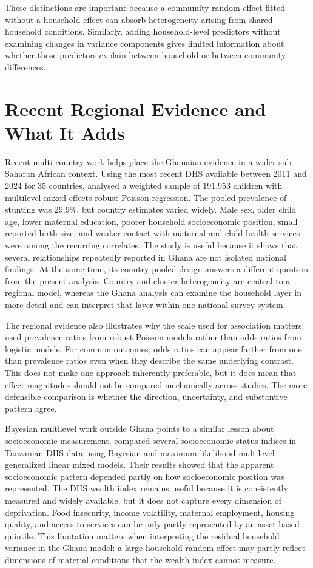 These distinctions are important because a community random effect fitted without a household effect can absorb heterogeneity arising from shared household conditions. Similarly, adding household-level predictors without examining changes in variance components gives limited information about whether those predictors explain between-household or between-community differences.

\section{Recent Regional Evidence and What It Adds}

Recent multi-country work helps place the Ghanaian evidence in a wider sub-Saharan African context. Using the most recent DHS available between 2011 and 2024 for 35 countries, \citet{MoloroEtAl2026} analysed a weighted sample of 191,953 children with multilevel mixed-effects robust Poisson regression. The pooled prevalence of stunting was 29.9\%, but country estimates varied widely. Male sex, older child age, lower maternal education, poorer household socioeconomic position, small reported birth size, and weaker contact with maternal and child health services were among the recurring correlates. The study is useful because it shows that several relationships repeatedly reported in Ghana are not isolated national findings. At the same time, its country-pooled design answers a different question from the present analysis. Country and cluster heterogeneity are central to a regional model, whereas the Ghana analysis can examine the household layer in more detail and can interpret that layer within one national survey system.

The regional evidence also illustrates why the scale used for association matters. \citet{MoloroEtAl2026} used prevalence ratios from robust Poisson models rather than odds ratios from logistic models. For common outcomes, odds ratios can appear farther from one than prevalence ratios even when they describe the same underlying contrast. This does not make one approach inherently preferable, but it does mean that effect magnitudes should not be compared mechanically across studies. The more defensible comparison is whether the direction, uncertainty, and substantive pattern agree.

Bayesian multilevel work outside Ghana points to a similar lesson about socioeconomic measurement. \citet{MusheiguzaEtAl2023} compared several socioeconomic-status indices in Tanzanian DHS data using Bayesian and maximum-likelihood multilevel generalized linear mixed models. Their results showed that the apparent socioeconomic pattern depended partly on how socioeconomic position was represented. The DHS wealth index remains useful because it is consistently measured and widely available, but it does not capture every dimension of deprivation. Food insecurity, income volatility, maternal employment, housing quality, and access to services can be only partly represented by an asset-based quintile. This limitation matters when interpreting the residual household variance in the Ghana model: a large household random effect may partly reflect dimensions of material conditions that the wealth index cannot measure.

